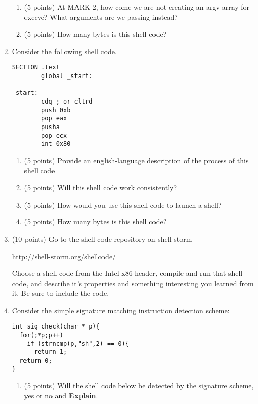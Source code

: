\documentclass{article}[9pt]
\begin{document}
\begin{enumerate}
\begin{enumerate}
\item (5 points) At MARK 2, how come we are not creating an argv array for
execve? What arguments are we passing instead?

\item (5 points) How many bytes is this shell code?
\end{enumerate}

\item Consider the following shell code. 

\begin{verbatim}
SECTION .text
        global _start:

_start:
        cdq ; or cltrd
        push 0xb
        pop eax
        pusha
        pop ecx
        int 0x80
\end{verbatim}

\begin{enumerate}
\item (5 points) Provide an english-language description of the process of this shell code

\item (5 points) Will this shell code work consistently?

\item (5 points) How would you use this shell code to launch a shell?

\item (5 points) How many bytes is this shell code?
\end{enumerate}

\item (10 points) Go to the shell code repository on shell-storm

\url{http://shell-storm.org/shellcode/}

Choose a shell code from the Intel x86 header, compile and run
that shell code, and describe it's properties and something
interesting you learned from it. Be sure to include the code.

\item Consider the simple signature matching instruction detection scheme:

\begin{verbatim}
int sig_check(char * p){
  for(;*p;p++)
    if (strncmp(p,"sh",2) == 0){
      return 1;
  return 0;
}
\end{verbatim}

\begin{enumerate}
\item (5 points) Will the shell code below be detected by the signature scheme, yes or no and \textbf{Explain}. 


\end{enumerate}
\end{enumerate}
\end{document}
